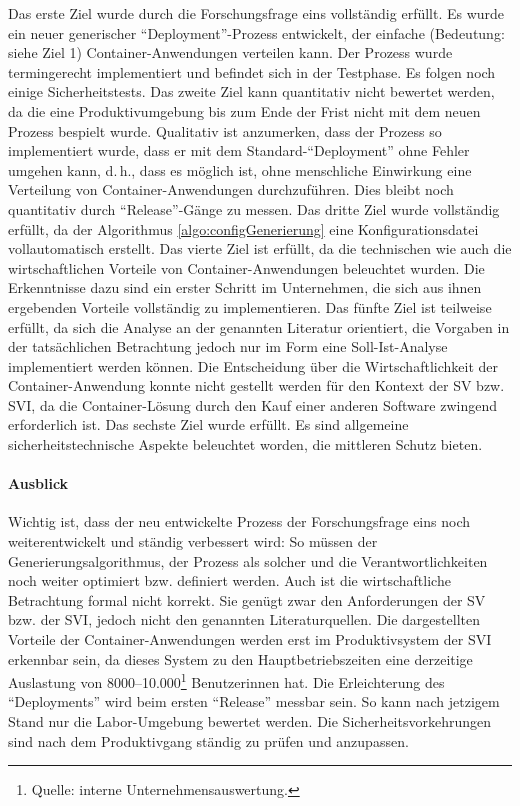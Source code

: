 Das erste Ziel wurde durch die Forschungsfrage eins vollständig erfüllt. Es wurde ein neuer generischer \enquote{Deployment}-Prozess entwickelt, der einfache (Bedeutung: siehe Ziel 1) Container-Anwendungen verteilen kann. Der Prozess wurde termingerecht implementiert und befindet sich in der Testphase. Es folgen noch einige Sicherheitstests. Das zweite Ziel kann quantitativ nicht bewertet werden, da die eine Produktivumgebung bis zum Ende der Frist nicht mit dem neuen Prozess bespielt wurde. Qualitativ ist anzumerken, dass der Prozess so implementiert wurde, dass er mit dem Standard-\enquote{Deployment} ohne Fehler umgehen kann, d.\,h., dass es möglich ist, ohne menschliche Einwirkung eine Verteilung von Container-Anwendungen durchzuführen. Dies bleibt noch quantitativ durch \enquote{Release}-Gänge zu messen. Das dritte Ziel wurde vollständig erfüllt, da der Algorithmus \vref{algo:configGenerierung} eine Konfigurationsdatei vollautomatisch erstellt. Das vierte Ziel ist erfüllt, da die technischen wie auch die wirtschaftlichen Vorteile von Container-Anwendungen beleuchtet wurden. Die Erkenntnisse dazu sind ein erster Schritt im Unternehmen, die sich aus ihnen ergebenden Vorteile vollständig zu implementieren. Das fünfte Ziel ist teilweise erfüllt, da sich die Analyse an der genannten Literatur orientiert, die Vorgaben in der tatsächlichen Betrachtung jedoch nur im Form eine Soll-Ist-Analyse implementiert werden können. Die Entscheidung über die Wirtschaftlichkeit der Container-Anwendung konnte nicht gestellt werden für den Kontext der \ac{SV} bzw. \ac{SVI}, da die Container-Lösung durch den Kauf einer anderen Software zwingend erforderlich ist. Das sechste Ziel wurde erfüllt. Es sind allgemeine sicherheitstechnische Aspekte beleuchtet worden, die mittleren Schutz bieten.  
\paragraph{Ausblick}
Wichtig ist, dass der neu entwickelte Prozess der Forschungsfrage eins noch weiterentwickelt und ständig verbessert wird: So müssen der Generierungsalgorithmus, der Prozess als solcher und die Verantwortlichkeiten noch weiter optimiert bzw. definiert werden. Auch ist die wirtschaftliche Betrachtung formal nicht korrekt. Sie genügt zwar den Anforderungen der \ac{SV} bzw. der \ac{SVI}, jedoch nicht den genannten Literaturquellen. Die dargestellten Vorteile der Container-Anwendungen werden erst im Produktivsystem der \ac{SVI} erkennbar sein, da dieses System zu den Hauptbetriebszeiten eine derzeitige Auslastung von 8000--10.000\footnote{Quelle: interne Unternehmensauswertung.} Benutzerinnen hat. Die Erleichterung des \enquote{Deployments} wird beim ersten \enquote{Release} messbar sein. So kann nach jetzigem Stand nur die Labor-Umgebung bewertet werden. Die Sicherheitsvorkehrungen sind nach dem Produktivgang ständig zu prüfen und anzupassen.

